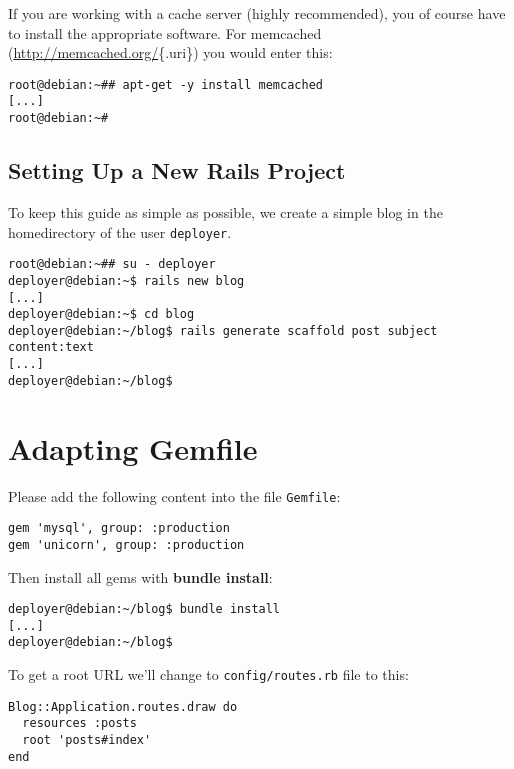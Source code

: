 \documentclass[a4paper]{book}
\newcommand{\chap}[1]{\newpage\thispagestyle{empty}\chapter{#1}\label{chap:\thechapter}}
\begin{document}
If you are working with a cache server (highly recommended), you of course have to install the appropriate software. For memcached (\url{http://memcached.org/}\{.uri\}) you would enter this:

\begin{shaded}\begin{verbatim}
root@debian:~## apt-get -y install memcached
[...]
root@debian:~#
\end{verbatim}\end{shaded}

\section{Setting Up a New Rails Project}\label{setting-up-a-new-rails-project}

To keep this guide as simple as possible, we create a simple blog in the homedirectory of the user \texttt{deployer}.

\begin{shaded}\begin{verbatim}
root@debian:~## su - deployer
deployer@debian:~$ rails new blog
[...]
deployer@debian:~$ cd blog
deployer@debian:~/blog$ rails generate scaffold post subject content:text
[...]
deployer@debian:~/blog$
\end{verbatim}\end{shaded}

\chap{Adapting Gemfile}\label{adapting-gemfile}

Please add the following content into the file \texttt{Gemfile}:

\begin{shaded}\begin{verbatim}
gem 'mysql', group: :production
gem 'unicorn', group: :production
\end{verbatim}\end{shaded}

Then install all gems with \textbf{bundle install}:

\begin{shaded}\begin{verbatim}
deployer@debian:~/blog$ bundle install
[...]
deployer@debian:~/blog$
\end{verbatim}\end{shaded}

To get a root URL we'll change to \texttt{config/routes.rb} file to this:

\begin{shaded}\begin{verbatim}
Blog::Application.routes.draw do
  resources :posts
  root 'posts#index'
end
\end{verbatim}\end{shaded}
\end{document}

